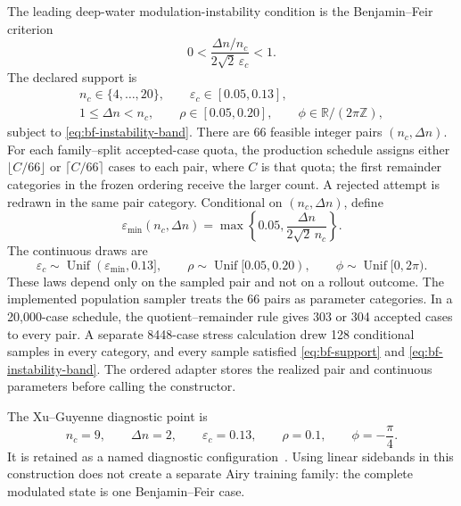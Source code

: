 \documentclass[11pt]{article}
\newcommand{\R}{\mathbb R}
\newcommand{\eps}{\varepsilon}
\begin{document}
The leading deep-water modulation-instability condition is
the Benjamin--Feir criterion~\cite{benjaminfeir1967}
\begin{equation}
  0<
  \frac{\Delta n/n_c}{2\sqrt{2}\,\eps_c}
  <1.
  \label{eq:bf-instability-band}
\end{equation}
The declared support is
\begin{equation}
  \begin{gathered}
  n_c\in\{4,\ldots,20\},\qquad
  \eps_c\in[0.05,0.13],\\
  1\leq\Delta n<n_c,\qquad
  \rho\in[0.05,0.20],\qquad
  \phi\in\R/(2\pi\mathbb Z),
  \end{gathered}
  \label{eq:bf-support}
\end{equation}
subject to \eqref{eq:bf-instability-band}.  There are 66 feasible integer
pairs $(n_c,\Delta n)$.  For each family--split
accepted-case quota, the production schedule assigns either
$\lfloor C/66\rfloor$ or $\lceil C/66\rceil$ cases to each pair, where $C$
is that quota; the first remainder categories in the frozen ordering receive the
larger count.  A rejected attempt is redrawn in the same pair category.
Conditional
on $(n_c,\Delta n)$, define
\begin{equation}
  \eps_{\min}(n_c,\Delta n)
  =
  \max\!\left\{0.05,\frac{\Delta n}{2\sqrt2\,n_c}\right\}.
  \label{eq:bf-conditional-lower-bound}
\end{equation}
The continuous draws are
\begin{equation}
  \eps_c\sim\operatorname{Unif}(\eps_{\min},0.13],\qquad
  \rho\sim\operatorname{Unif}[0.05,0.20),\qquad
  \phi\sim\operatorname{Unif}[0,2\pi).
  \label{eq:bf-continuous-laws}
\end{equation}
These laws depend only on the sampled pair and not on a rollout outcome.
The implemented population sampler treats the 66 pairs as parameter categories.
In a 20,000-case schedule, the quotient--remainder rule gives 303 or 304
accepted cases to every pair.  A separate 8448-case stress calculation drew 128
conditional samples in every category, and every sample satisfied
\eqref{eq:bf-support} and \eqref{eq:bf-instability-band}.  The ordered adapter
stores the realized pair and continuous parameters before calling the
constructor.

The Xu--Guyenne diagnostic point is
\begin{equation}
  n_c=9,\qquad \Delta n=2,\qquad \eps_c=0.13,\qquad
  \rho=0.1,\qquad \phi=-\frac{\pi}{4}.
  \label{eq:xu-guyenne-bf-point}
\end{equation}
It is retained as a named diagnostic configuration~\cite{xu2009}.  Using
linear sidebands in this construction does not create a separate Airy
training family: the complete modulated state is one Benjamin--Feir case.
\end{document}
